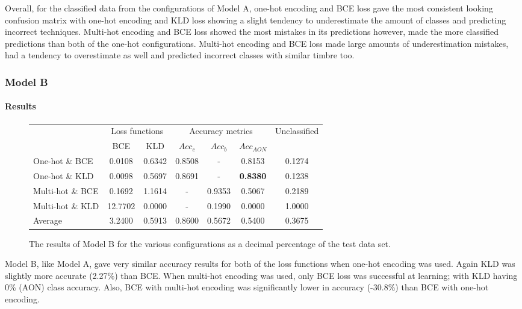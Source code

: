 \documentclass[12pt]{article}
\begin{document}
	Overall, for the classified data from the configurations of Model A, one-hot encoding and BCE loss gave the most consistent looking confusion matrix with one-hot encoding and KLD loss showing a slight tendency to underestimate the amount of classes and predicting incorrect techniques. Multi-hot encoding and BCE loss showed the most mistakes in its predictions however, made the more classified predictions than both of the one-hot configurations. Multi-hot encoding and BCE loss made large amounts of underestimation mistakes, had a tendency to overestimate as well and predicted incorrect classes with similar timbre too.\medskip
	
	\subsubsection{Model B}
	\label{sec:evaluation_analysis_modelB}
	
	\paragraph*{Results}
	
	\begin{figure}[H]
	    \centering
	    \begin{tabular}{l|c|c|c|c|c|c|}
	        & \multicolumn{2}{c|}{Loss functions} & \multicolumn{3}{c|}{Accuracy metrics} & \multirow{2}{*}{Unclassified}\\
	        \cline{2-6}
	        & BCE & KLD & $Acc_{c}$ & $Acc_{b}$ & $Acc_{AON}$ &\\
	        \hline
	        One-hot \& BCE & 0.0108 & 0.6342 & 0.8508 & - & 0.8153 & 0.1274\\
	        \hline
	        One-hot \& KLD & 0.0098 & 0.5697 & 0.8691 & - & \textbf{0.8380} & 0.1238\\
	        \hline
	        Multi-hot \& BCE & 0.1692 & 1.1614 & - & 0.9353 & 0.5067 & 0.2189\\
	        \hline
	        Multi-hot \& KLD & 12.7702 & 0.0000 & - & 0.1990 & 0.0000 & 1.0000\\
	        \bottomrule
	        Average & 3.2400 & 0.5913 & 0.8600 & 0.5672 & 0.5400 & 0.3675\\
	       \bottomrule
	    \end{tabular}
	    \caption{The results of Model B for the various configurations as a decimal percentage of the test data set.}
	    \label{fig:modelB}
	\end{figure}
	
	Model B, like Model A, gave very similar accuracy results for both of the loss functions when one-hot encoding was used. Again KLD was slightly more accurate (2.27\%) than BCE. When multi-hot encoding was used, only BCE loss was successful at learning; with KLD having 0\% (AON) class accuracy. Also, BCE with multi-hot encoding was significantly lower in accuracy (-30.8\%) than BCE with one-hot encoding.\medskip
	
\end{document}

